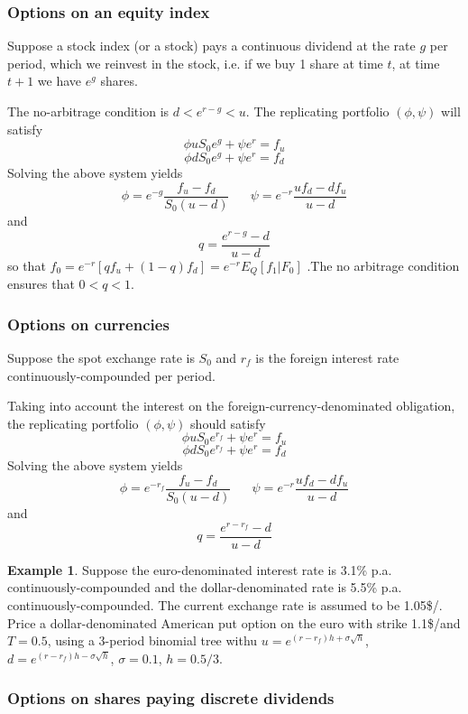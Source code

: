 \documentclass[11pt,a4paper]{book}
\theoremstyle{definition}\newtheorem{definition}{Definition}
\theoremstyle{definition}\newtheorem{fact}{Fact}
\theoremstyle{definition}\newtheorem{remark}{Remark}
\theoremstyle{definition}\newtheorem{ex}{Ex.}
\theoremstyle{definition}\newtheorem{project}{Project}
\theoremstyle{definition}\newtheorem{problem}{Problem}
\theoremstyle{definition}\newtheorem{example}{Example}
\numberwithin{theorem}{section}
\numberwithin{corollary}{chapter}
\numberwithin{assumption}{chapter}
\numberwithin{definition}{chapter}
\numberwithin{prop}{chapter}
\numberwithin{notation}{chapter}
\numberwithin{problem}{chapter}
\numberwithin{example}{chapter}
\numberwithin{fact}{chapter}
\numberwithin{ex}{chapter}
\begin{document}
\subsubsection*{Options on an equity index}

Suppose a stock index (or a stock) pays a continuous dividend at the rate $g$ per period, which we reinvest in the stock, i.e. if we buy 1 share at time $t$, at time $t + 1$ we have $e^g$ shares.

The no-arbitrage condition is $d < e^{r-g} < u$. The replicating portfolio $(\phi, \psi)$ will satisfy
$$ \phi u S_0 e^g + \psi e^r = f_u $$
$$ \phi d S_0 e^g + \psi e^r = f_d $$
Solving the above system yields
$$ \phi = e^{-g} \frac{f_u - f_d}{S_0(u-d)} \,\,\,\,\,\,\,\,\,\, \psi = e^{-r}\frac{uf_d - df_u}{u-d} $$
and
$$ q = \frac{e^{r-g} - d}{u-d} $$
so that $f_0 = e^{-r} [qf_u + (1-q) f_d] = e^{-r} E_Q[f_1|F_0]$ .The no arbitrage condition ensures that $0<q<1$.

\subsubsection*{Options on currencies}

Suppose the spot exchange rate is $S_0$ and $r_f$ is the foreign interest rate continuously-compounded per period.

Taking into account the interest on the foreign-currency-denominated obligation, the replicating portfolio $(\phi, \psi)$ should satisfy
$$ \phi u S_0 e^{r_f} + \psi e^r = f_u $$
$$ \phi d S_0 e^{r_f} + \psi e^r = f_d $$
Solving the above system yields
$$ \phi = e^{-r_f} \frac{f_u - f_d}{S_0(u-d)} \,\,\,\,\,\,\,\,\,\, \psi = e^{-r}\frac{uf_d - df_u}{u-d} $$
and
$$ q = \frac{e^{r-r_f} - d}{u-d} $$

\begin{example}
Suppose the euro-denominated interest rate is 3.1\% p.a. continuously-compounded and the dollar-denominated rate is 5.5\% p.a. continuously-compounded. The current exchange rate is assumed to be 1.05\$/\texteuro. Price a dollar-denominated American put option on the euro with strike 1.1\$/\texteuro and $T=0.5$, using a 3-period binomial tree withu $u = e^{(r-r_f)h+\sigma \sqrt{h}}$, $d = e^{(r-r_f)h- \sigma \sqrt{h}}$, $\sigma = 0.1$, $h = 0.5/3$.
\end{example}

\subsubsection*{Options on shares paying discrete dividends}
\end{document}
